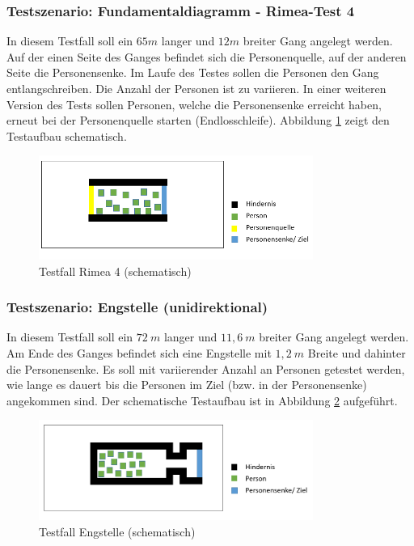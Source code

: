 \subsubsection{Testszenario: Fundamentaldiagramm - Rimea-Test 4}
\label{Anforderungen:RimeaTest}
In diesem Testfall soll ein $65m$ langer und $12m$ breiter Gang angelegt werden. Auf der einen Seite des Ganges befindet sich die Personenquelle, auf der anderen Seite die Personensenke. Im Laufe des Testes sollen die Personen den Gang entlangschreiben. Die Anzahl der Personen ist zu variieren. In einer weiteren Version des Tests sollen Personen, welche die Personensenke erreicht haben, erneut bei der Personenquelle starten (Endlosschleife). Abbildung \ref{fig:Test_Rimea4} zeigt den Testaufbau schematisch.

\begin{figure}[htpb]
	\centering
	\includegraphics[width=0.8\textwidth]{abbildungen/Test_Rimea4-2.png}
	\caption{Testfall Rimea 4 (schematisch)}
	\label{fig:Test_Rimea4}
\end{figure}

\subsubsection{Testszenario: Engstelle (unidirektional)}
In diesem Testfall soll ein $72\ m$ langer und $11,6\ m$ breiter Gang angelegt werden. Am Ende des Ganges befindet sich eine Engstelle mit $1,2\ m$ Breite und dahinter die Personensenke. Es soll mit variierender Anzahl an Personen getestet werden, wie lange es dauert bis die Personen im Ziel (bzw. in der Personensenke) angekommen sind. Der schematische Testaufbau ist in Abbildung \ref{fig:Engstelle} aufgeführt.

\begin{figure}[htpb]
	\centering
	\includegraphics[width=0.8\textwidth]{abbildungen/Test_Engstelle.png}
	\caption{Testfall Engstelle (schematisch)}
	\label{fig:Engstelle}
\end{figure}

